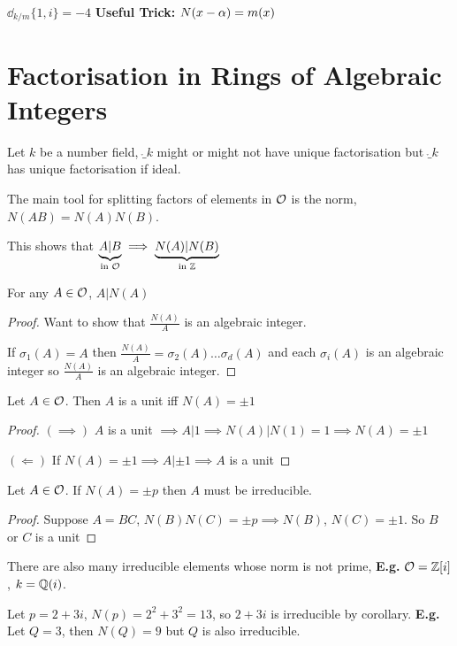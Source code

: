 \documentclass[11pt]{article}
\begin{document}
$\dd_{k/m} \{1, i\} = -4$
\spac
\textbf{Useful Trick:} $N(x-\alpha) = m(x)$


\section{Factorisation in Rings of Algebraic Integers}
Let $k$ be a number field, $\ring_k$ might or might not have unique factorisation but $\ring_k$ has unique factorisation if ideal. 

\spa
The main tool for splitting factors of elements in $\mathcal{O}$ is the norm, $N(AB) = N(A)N(B)$.

This shows that $\underbrace{A | B}_\text{in $\mathcal{O}$} \implies \underbrace{N(A)|N(B)}_\text{in $\mathbb{Z}$} $ 

\begin{prop}
	For any $A \in \mathcal{O}$, $A|N(A)$
\end{prop}

\begin{proof}
	Want to show that $\frac{N(A)}{A}$ is an algebraic integer.
\spa

	If $\sigma_1(A) = A$ then $\frac{N(A)}A = \sigma_2(A)\dots\sigma_d(A)$ and each $\sigma_i(A)$ is an algebraic integer so $\frac{N(A)}{A}$ is an algebraic integer.
\end{proof}


\begin{cor}
	Let $A \in \mathcal{O}$. Then $A$ is a unit iff $N(A) = \pm 1$
\end{cor}
\begin{proof}
	$(\implies)$ $A$ is a unit $\implies A|1 \implies N(A) | N(1) = 1 \implies N(A) = \pm 1$
\spa

	$(\Longleftarrow)$ If $N(A) = \pm 1 \implies A| \pm 1 \implies A$ is a unit
\end{proof}


\begin{cor}
	Let $A \in \mathcal{O}$. If $N(A) = \pm p $ then $A$ must be irreducible.
\end{cor}

\begin{proof}
	Suppose $A= BC$, $N(B)N(C) = \pm p \implies N(B)$, $N(C) = \pm 1$. So $B$ or $C$ is a unit
\end{proof}
\spa
There are also many irreducible elements whose norm is not prime, 
\spac 
\textbf{E.g.}
$\mathcal{O} = \mathbb{Z}[i]$, $ k = \mathbb{Q}(i)$.
\spa

Let $p = 2+3i$, $N(p) = 2^2+3^2 = 13$, so $2+3i$ is irreducible by corollary.
\spac
\textbf{E.g.} Let $Q=3$, then $N(Q) = 9$ but $Q$ is also irreducible.
\end{document}
